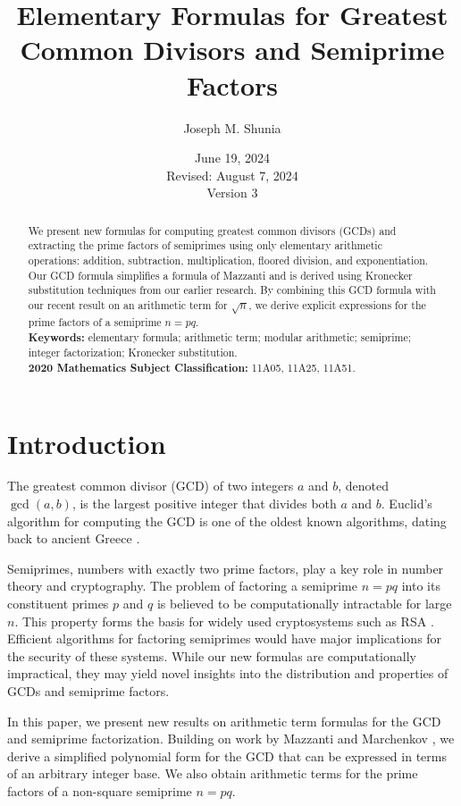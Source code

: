 \documentclass{article}
\title{Elementary Formulas for Greatest Common Divisors and Semiprime Factors}
\author{Joseph M. Shunia}
\date{June 19, 2024 \\ \small Revised: August 7, 2024 \\ Version 3 \normalsize}
\theoremstyle{plain}
\theoremstyle{definition}
\begin{document}
\maketitle

\begin{abstract}
\noindent We present new formulas for computing greatest common divisors (GCDs) and extracting the prime factors of semiprimes using only elementary arithmetic operations: addition, subtraction, multiplication, floored division, and exponentiation. Our GCD formula simplifies a formula of Mazzanti and is derived using Kronecker substitution techniques from our earlier research. By combining this GCD formula with our recent result on an arithmetic term for $\sqrt{n}$, we derive explicit expressions for the prime factors of a semiprime $n=p q$.
 \\[2mm]
 {\bf Keywords:} elementary formula; arithmetic term; modular arithmetic; semiprime; integer factorization; Kronecker substitution.\\[2mm]
 {\bf 2020 Mathematics Subject Classification:} 11A05, 11A25, 11A51.
 \end{abstract}

\section{Introduction}
The greatest common divisor (GCD) of two integers $a$ and $b$, denoted $\gcd(a,b)$, is the largest positive integer that divides both $a$ and $b$. Euclid's algorithm for computing the GCD is one of the oldest known algorithms, dating back to ancient Greece \cite{knuth1997art}.

Semiprimes, numbers with exactly two prime factors, play a key role in number theory and cryptography. The problem of factoring a semiprime $n=pq$ into its constituent primes $p$ and $q$ is believed to be computationally intractable for large $n$. This property forms the basis for widely used cryptosystems such as RSA \cite{rivest1978rsa}. Efficient algorithms for factoring semiprimes would have major implications for the security of these systems. While our new formulas are computationally impractical, they may yield novel insights into the distribution and properties of GCDs and semiprime factors.

In this paper, we present new results on arithmetic term formulas for the GCD and semiprime factorization. Building on work by Mazzanti and Marchenkov \cite{mazzanti2002plainbases, marchenkov1980superposition}, we derive a simplified polynomial form for the GCD that can be expressed in terms of an arbitrary integer base. We also obtain arithmetic terms for the prime factors of a non-square semiprime $n=p q$. 
\end{document}
